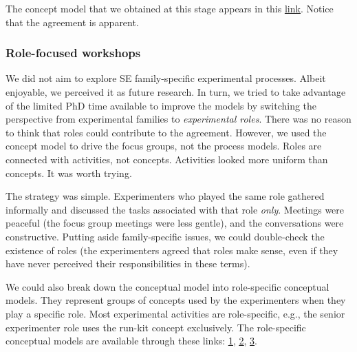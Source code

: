 The concept model that we obtained at this stage appears in this \href{https://zenodo.org/record/7102405#.YyuAfOzMLUI}{\ul{link}}. Notice that the agreement is apparent. 

\subsubsection{Role-focused workshops}\label{subsubsec-focus-groups-role}
We did not aim to explore SE family-specific experimental processes. Albeit enjoyable, we perceived it as future research. In turn, we tried to take advantage of the limited PhD time available to improve the models by switching the perspective from experimental families to \textit{experimental roles}. There was no reason to think that roles could contribute to the agreement. However, we used the concept model to drive the focus groups, not the process models. Roles are connected with activities, not concepts. Activities looked more uniform than concepts. It was worth trying.

The strategy was simple. Experimenters who played the same role gathered informally and discussed the tasks associated with that role \textit{only}. Meetings were peaceful (the focus group meetings were less gentle), and the conversations were constructive. Putting aside family-specific issues, we could double-check the existence of roles (the experimenters agreed that roles make sense, even if they have never perceived their responsibilities in these terms). 

We could also break down the conceptual model into role-specific conceptual models. They represent groups of concepts used by the experimenters when they play a specific role. Most experimental activities are role-specific, e.g., the senior experimenter role uses the run-kit concept exclusively. The role-specific conceptual models are available through these links: \href{https://zenodo.org/record/7102431#.YyuFvuzMLUI}{\ul{1}}, \href{https://zenodo.org/record/7102450#.YyuG2OzMLUI}{\ul{2}}, \href{https://zenodo.org/record/7102464#.YyuIkOzMLUI}{\ul{3}}. 